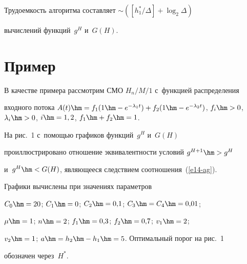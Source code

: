   


  Трудоемкость алгоритма составляет $\sim ([h_1^*/\Delta] +\log_2\Delta)$ 


вычислений функций~$g^H$ и~$G(H)$.


  


  \section{Пример}


  


  В качестве примера рассмотрим СМО $H_n/M/1$ с~функцией распределения 


входного потока $A(t)\hm= f_1(1\hm-e^{-\lambda_1 t})+f_2(1\hm- e^{-\lambda_2 


t})$, $f_i\hm> 0$, $\lambda_i\hm> 0$, $i\hm= 1,2$, $f_1\hm+f_2\hm=1$.


  


  На рис.~1 с~помощью графиков функций~$g^H$ и~$G(H)$ 


проиллюстрировано отношение эквивалентности условий $g^{H+1}\hm> g^H$ 


и~$g^H\hm< G(H)$, являющееся следствием соотношения~(\ref{e14-ag}). 


Графики вычислены при значениях параметров 


  $C_0\hm=20$; $C_1\hm=0$; $C_2\hm=0{,}1$; $C_3\hm=C_4\hm=0{,}01$; 


$\mu\hm=1$; $n\hm=2$; $f_1\hm=0{,}3$; $f_2\hm=0{,}7$; $v_1\hm=2$; 


$v_2\hm=1$; $a\hm=h_2\hm-h_1\hm=5$. Оптимальный порог на рис.~1 


обозначен через~$H^*$.


  


  


  


